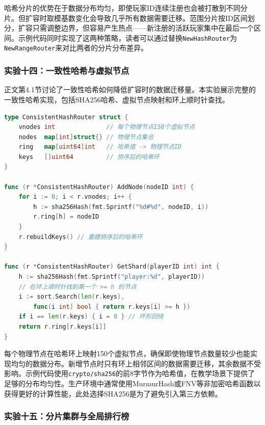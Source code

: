 哈希分片的优势在于数据分布均匀，即使玩家ID连续注册也会被打散到不同分片。但扩容时取模基数变化会导致几乎所有数据需要迁移。范围分片按ID区间划分，扩容只需调整边界，但容易产生热点——新注册的活跃玩家集中在最后一个区间。示例代码同时实现了这两种策略，读者可以通过替换\texttt{NewHashRouter}为\texttt{NewRangeRouter}来对比两者的分片分布差异。

\subsubsection{实验十四：一致性哈希与虚拟节点}

正文第4.1节讨论了一致性哈希如何降低扩容时的数据迁移量。本实验展示完整的一致性哈希实现，包括SHA256哈希、虚拟节点映射和环上顺时针查找。

\begin{tcolorbox}[title=一致性哈希核心逻辑]
\begin{lstlisting}[style=codeblock, language=go]
type ConsistentHashRouter struct {
    vnodes int              // 每个物理节点150个虚拟节点
    nodes  map[int]struct{} // 物理节点集合
    ring   map[uint64]int   // 哈希值 -> 物理节点ID
    keys   []uint64         // 排序后的哈希环
}

func (r *ConsistentHashRouter) AddNode(nodeID int) {
    for i := 0; i < r.vnodes; i++ {
        h := sha256Hash(fmt.Sprintf("%d#%d", nodeID, i))
        r.ring[h] = nodeID
    }
    r.rebuildKeys() // 重建排序后的哈希环
}

func (r *ConsistentHashRouter) GetShard(playerID int) int {
    h := sha256Hash(fmt.Sprintf("player:%d", playerID))
    // 在环上顺时针找到第一个 >= h 的节点
    i := sort.Search(len(r.keys),
        func(i int) bool { return r.keys[i] >= h })
    if i == len(r.keys) { i = 0 } // 环形回绕
    return r.ring[r.keys[i]]
}
\end{lstlisting}
\end{tcolorbox}

每个物理节点在哈希环上映射150个虚拟节点，确保即使物理节点数量较少也能实现均匀的数据分布。新增节点时只有环上相邻区间的数据需要迁移，其余数据不受影响。示例代码使用\texttt{crypto/sha256}的前8字节作为哈希值，在教学场景下提供了足够的分布均匀性。生产环境中通常使用MurmurHash或FNV等非加密哈希函数以获得更好的计算性能，此处选择SHA256是为了避免引入第三方依赖。

\subsubsection{实验十五：分片集群与全局排行榜}

